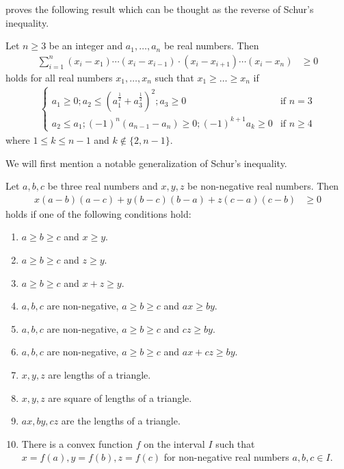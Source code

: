 \documentclass{subfile}
\begin{document}
	\textcite{oppenheim_davies_1964} proves the following result which can be thought as the reverse of Schur's inequality.
		\begin{theorem}
			Let $n\geq 3$ be an integer and $a_{1},\ldots,a_{n}$ be real numbers. Then
				\begin{align*}
					\sum\limits_{i=1}^{n}(x_{i}-x_{1})\cdots(x_{i}-x_{i-1})\cdot(x_{i}-x_{i+1})\cdots(x_{i}-x_{n})
						& \geq 0
				\end{align*}
			holds for all real numbers $x_{1},\ldots,x_{n}$ such that $x_{1}\geq\ldots\geq x_{n}$ if
				\begin{align*}
					\begin{cases}
						a_{1}\geq 0; a_{2}\leq \left(a_{1}^{\frac{1}{2}}+a_{3}^{\frac{1}{2}}\right)^{2};a_{3}\geq 0& \mbox{if }n=3\\
						a_{2}\leq a_{1}; (-1)^{n}(a_{n-1}-a_{n})\geq 0;(-1)^{k+1}a_{k}\geq 0& \mbox{if }n\geq 4
					\end{cases}
				\end{align*}
			where $1\leq k\leq n-1$ and $k\not\in\{2,n-1\}$.
		\end{theorem}
	We will first mention a notable generalization of Schur's inequality.
		\begin{theorem}\label{thm:svm}
			Let $a,b,c$ be three real numbers and $x,y,z$ be non-negative real numbers. Then
				\begin{align*}
					x(a-b)(a-c)+y(b-c)(b-a)+z(c-a)(c-b)
						& \geq 0
				\end{align*}
			holds if one of the following conditions hold:
				\begin{enumerate}[(1)]
					\item $a\geq b\geq c$ and $x\geq y$.
					\item $a\geq b\geq c$ and $z\geq y$.
					\item $a\geq b\geq c$ and $x+z\geq y$.
					\item $a,b,c$ are non-negative, $a\geq b\geq c$ and $ax\geq by$.
					\item $a,b,c$ are non-negative, $a\geq b\geq c$ and $cz\geq by$.
					\item $a,b,c$ are non-negative, $a\geq b\geq c$ and $ax+cz\geq by$.
					\item $x,y,z$ are lengths of a triangle.
					\item $x,y,z$ are square of lengths of a triangle.
					\item $ax,by,cz$ are the lengths of a triangle.
					\item There is a convex function $f$ on the interval $I$ such that $x=f(a),y=f(b),z=f(c)$ for non-negative real numbers $a,b,c\in I$.
				\end{enumerate}
		\end{theorem}
\end{document}
